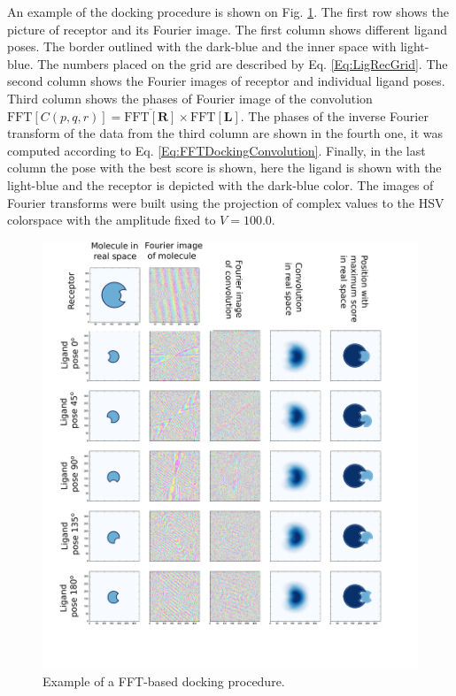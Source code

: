 An example of the docking procedure is shown on Fig. \ref{Fig:FFTDocking}. The first row shows the picture of receptor and its Fourier image. The first column shows different
ligand poses. The border outlined with the dark-blue and the inner space with light-blue. The numbers placed on the grid are described by Eq. \ref{Eq:LigRecGrid}.
The second column shows the Fourier images of receptor and individual ligand poses. Third column shows the phases of Fourier image of the convolution 
$\mbox{FFT}[C(p,q,r)]=\overline{\mbox{FFT}[\mathbf{R}]}\times \mbox{FFT}[\mathbf{L}]$. The phases of the inverse Fourier transform of the data from the third column are
shown in the fourth one, it was computed according to Eq. \ref{Eq:FFTDockingConvolution}. Finally, in the last column the pose with the best score is shown, here the ligand is shown with the light-blue and the 
receptor is depicted with the dark-blue color. The images of Fourier transforms were built using the projection of complex values to the HSV colorspace \cite{PetrisonE2013visualizing} with the 
amplitude fixed to $V=100.0$.

\begin{figure}[H]
    \begin{centering}
      \includegraphics[width=1.0\linewidth]{Intro/Fig/DockingExample}  
      \caption[FFT-based docking example]{Example of a FFT-based docking procedure.}
      \label{Fig:FFTDocking}
    \end{centering}
\end{figure}


